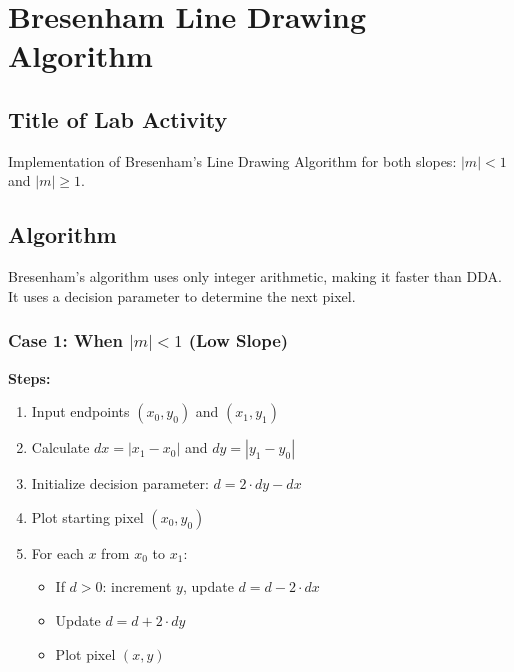 \documentclass[12pt,a4paper]{article}
\begin{document}
\newpage
\section{Bresenham Line Drawing Algorithm}

\subsection{Title of Lab Activity}
Implementation of Bresenham's Line Drawing Algorithm for both slopes: $|m| < 1$ and $|m| \geq 1$.

\subsection{Algorithm}
Bresenham's algorithm uses only integer arithmetic, making it faster than DDA. It uses a decision parameter to determine the next pixel.

\subsubsection{Case 1: When $|m| < 1$ (Low Slope)}
\textbf{Steps:}
\begin{enumerate}
    \item Input endpoints $(x_0, y_0)$ and $(x_1, y_1)$
    \item Calculate $dx = |x_1 - x_0|$ and $dy = |y_1 - y_0|$
    \item Initialize decision parameter: $d = 2 \cdot dy - dx$
    \item Plot starting pixel $(x_0, y_0)$
    \item For each $x$ from $x_0$ to $x_1$:
    \begin{itemize}
        \item If $d > 0$: increment $y$, update $d = d - 2 \cdot dx$
        \item Update $d = d + 2 \cdot dy$
        \item Plot pixel $(x, y)$
    \end{itemize}
\end{enumerate}
\end{document}
